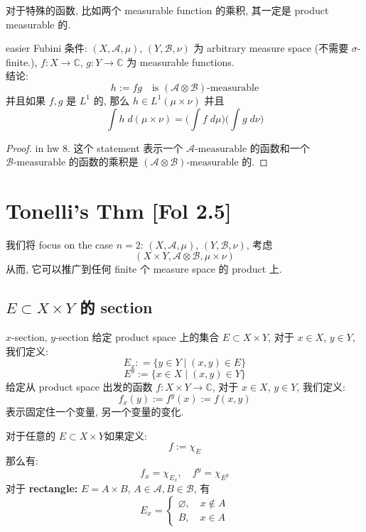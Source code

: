 \documentclass[lang=cn,11pt]{elegantbook}
\begin{document}
对于特殊的函数, 比如两个 measurable function 的乘积, 其一定是 product measurable 的.
\begin{lemma}{easier Fubini}
条件: $(X,\mathcal{A},\mu)$, $(Y,\mathcal{B}, \nu)$ 为 arbitrary measure space (不需要 $\sigma$-finite.), $f:X\to \mathbb{C}$, $g:Y \to \mathbb{C}$ 为 measurable functions.\\
结论: \[
h:= fg  \quad \text{is } (\mathcal{A} \otimes \mathcal{B}) \text{-measurable}
\]
并且如果 $f,g$ 是 $L^1$ 的, 那么 $h \in L^1(\mu \times \nu)$ 并且 \[
\int h \; d(\mu\times \nu) = \Big( \int f \; d\mu \Big)\Big( \int g \; d\nu \Big)
\]
\end{lemma}
\begin{proof}
     in hw 8. 这个 statement 表示一个 $\mathcal{A} \text{-measurable}$ 的函数和一个 $\mathcal{B} \text{-measurable}$ 的函数的乘积是 $(\mathcal{A} \otimes \mathcal{B}) \text{-measurable}$ 的.\end{proof}






\chapter{Tonelli's Thm [Fol 2.5]}

 我们将 focus on the case $n=2$: $(X,\mathcal{A}, \mu)$, $(Y, \mathcal{B}, \nu)$, 考虑 \[
 (X \times Y, \mathcal{A} \otimes \mathcal{B}, \mu \times \nu)
 \]
 从而, 它可以推广到任何 finite 个 measure space 的 product 上.

\section{$E\subset X \times Y $ 的 section }
\begin{definition}{$x$-section, $y$-section}
给定 product space 上的集合 $E \subset X \times Y$, 对于 $x \in X$, $y\in Y$, 我们定义:
\[E_x : = \{  y\in Y \mid (x,y) \in E \}\]
\[
E^y := \{x\in X \mid (x,y) \in Y  \}
\]
给定从 product space 出发的函数 $f: X \times Y \to \mathbb{C}$, 对于 $x \in X$, $y\in Y$, 我们定义: \[
f_x (y) := f^y(x) := f(x,y)
\]
表示固定住一个变量, 另一个变量的变化.
\end{definition}

\begin{example}
对于任意的 $E \subset X \times Y$如果定义: \[
    f:= \chi_E
    \]
那么有: \[
f_x = \chi_{E_x},\quad f^y = \chi_{E^y}
\]
对于 \textbf{rectangle:} $E = A \times B $, $A \in \mathcal{A}, B \in \mathcal{B}$, 有 $$E_x = \begin{cases}
        \varnothing ,\quad x\not\in A \\
        B ,\quad x\in A
    \end{cases}$$
\end{example}
\end{document}
